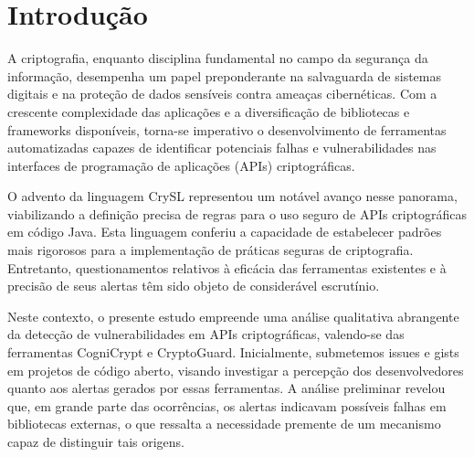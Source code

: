 

\section{Introdução}%

A criptografia, enquanto disciplina fundamental no campo da segurança da informação, desempenha um papel preponderante na salvaguarda de sistemas digitais e na proteção de dados sensíveis contra ameaças cibernéticas. Com a crescente complexidade das aplicações e a diversificação de bibliotecas e frameworks disponíveis, torna-se imperativo o desenvolvimento de ferramentas automatizadas capazes de identificar potenciais falhas e vulnerabilidades nas interfaces de programação de aplicações (APIs) criptográficas.

O advento da linguagem CrySL representou um notável avanço nesse panorama, viabilizando a definição precisa de regras para o uso seguro de APIs criptográficas em código Java. Esta linguagem conferiu a capacidade de estabelecer padrões mais rigorosos para a implementação de práticas seguras de criptografia. Entretanto, questionamentos relativos à eficácia das ferramentas existentes e à precisão de seus alertas têm sido objeto de considerável escrutínio.

Neste contexto, o presente estudo empreende uma análise qualitativa abrangente da detecção de vulnerabilidades em APIs criptográficas, valendo-se das ferramentas CogniCrypt e CryptoGuard. Inicialmente, submetemos issues e gists em projetos de código aberto, visando investigar a percepção dos desenvolvedores quanto aos alertas gerados por essas ferramentas. A análise preliminar revelou que, em grande parte das ocorrências, os alertas indicavam possíveis falhas em bibliotecas externas, o que ressalta a necessidade premente de um mecanismo capaz de distinguir tais origens.

